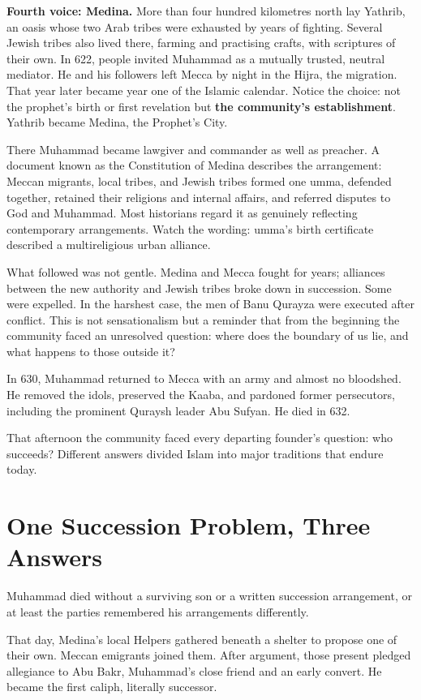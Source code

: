 \textbf{Fourth voice: Medina.} More than four hundred kilometres north lay Yathrib, an oasis whose two Arab tribes were exhausted by years of fighting. Several Jewish tribes also lived there, farming and practising crafts, with scriptures of their own. In 622, people invited Muhammad as a mutually trusted, neutral mediator. He and his followers left Mecca by night in the Hijra, the migration. That year later became year one of the Islamic calendar. Notice the choice: not the prophet's birth or first revelation but \textbf{the community's establishment}. Yathrib became Medina, the Prophet's City.

There Muhammad became lawgiver and commander as well as preacher. A document known as the Constitution of Medina describes the arrangement: Meccan migrants, local tribes, and Jewish tribes formed one umma, defended together, retained their religions and internal affairs, and referred disputes to God and Muhammad. Most historians regard it as genuinely reflecting contemporary arrangements. Watch the wording: umma's birth certificate described a multireligious urban alliance.

What followed was not gentle. Medina and Mecca fought for years; alliances between the new authority and Jewish tribes broke down in succession. Some were expelled. In the harshest case, the men of Banu Qurayza were executed after conflict. This is not sensationalism but a reminder that from the beginning the community faced an unresolved question: where does the boundary of us lie, and what happens to those outside it?

In 630, Muhammad returned to Mecca with an army and almost no bloodshed. He removed the idols, preserved the Kaaba, and pardoned former persecutors, including the prominent Quraysh leader Abu Sufyan. He died in 632.

That afternoon the community faced every departing founder's question: who succeeds? Different answers divided Islam into major traditions that endure today.

\section{One Succession Problem, Three Answers}
Muhammad died without a surviving son or a written succession arrangement, or at least the parties remembered his arrangements differently.

That day, Medina's local Helpers gathered beneath a shelter to propose one of their own. Meccan emigrants joined them. After argument, those present pledged allegiance to Abu Bakr, Muhammad's close friend and an early convert. He became the first caliph, literally successor.


